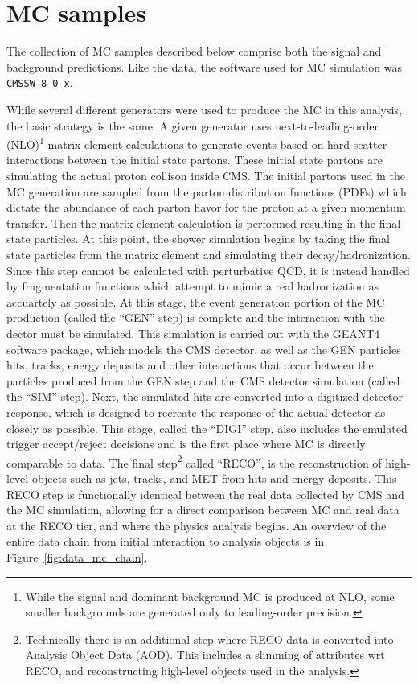 \section{MC samples}
The collection of MC samples described below comprise both the signal and background predictions. 
Like the data, the software used for MC simulation was \texttt{CMSSW\_8\_0\_x}.


While several different generators were used to produce the MC in this analysis, the basic strategy is the same.
A given generator uses next-to-leading-order (NLO)\footnote{While the signal and dominant background MC is produced
at NLO, some smaller backgrounds are generated only to leading-order precision.}
matrix element calculations to generate events based on hard scatter
interactions between the initial state partons. These initial state partons are simulating the
actual proton collison inside CMS. The initial partons used in the MC generation are sampled from the parton
distribution functions (PDFs) which dictate the abundance of each parton flavor for the proton at a given momentum transfer.
Then the matrix element calculation is performed resulting in the final state particles. At this point, the shower simulation
begins by taking the final state particles from the matrix element and simulating their decay/hadronization. Since this step
cannot be calculated with perturbative QCD, it is instead handled by fragmentation functions which attempt to mimic a real
hadronization as accuartely as possible. At this stage, the event generation portion of the MC production (called the ``GEN'' step)
is complete and the interaction with the dector must be simulated. This simulation is carried out with the GEANT4 software package,
which models the CMS detector, as well as the GEN particles hits, tracks, energy deposits and other interactions that occur
between the particles produced from the GEN step and the CMS detector simulation (called the ``SIM'' step). Next, the simulated
hits are converted into a digitized detector response, which is designed to recreate the response of the actual detector as
closely as possible. This stage, called the ``DIGI'' step, also includes the emulated trigger accept/reject decisions and is the
first place where MC is directly comparable to data. The final step\footnote{Technically there is an additional step where RECO data
is converted into Analysis Object Data (AOD). This includes a slimming of attributes wrt RECO, and reconstructing high-level objects
used in the analysis.} called ``RECO'', is the reconstruction of high-level objects such as jets, tracks, and MET from hits and
energy deposits. This RECO step is functionally identical between the real data collected by CMS and the MC simulation, allowing
for a direct comparison between MC and real data at the RECO tier, and where the physics analysis begins. An overview of the entire
data chain from initial interaction to analysis objects is in Figure~\ref{fig:data_mc_chain}.

